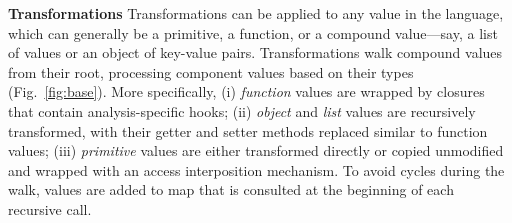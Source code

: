 \documentclass[letterpaper,twocolumn,10pt]{article}
\newcommand{\heading}[1]{\vspace{2pt}\noindent\textbf{#1}\enspace}
\newcommand{\ttt}[1]{\texttt{#1}}
\newcommand{\sys}{{\scshape Lya}\xspace}
\newcommand{\pc}{PIC\xspace}
\begin{document}
\heading{Transformations}
Transformations can be applied to any value in the language, which can generally be a primitive, a function, or a compound value---say, a list of values or an object of key-value pairs.
Transformations walk compound values from their root, processing component values based on their types (Fig.~\ref{fig:base}).
More specifically,
  (i) \emph{function} values are wrapped by closures that contain analysis-specific hooks; %
  (ii) \emph{object} and \emph{list} values are recursively transformed, with their getter and setter methods replaced similar to function values; %
  (iii) \emph{primitive} values are either transformed directly or copied unmodified and wrapped with an access interposition mechanism.
To avoid cycles during the walk, values are added to map that is consulted at the beginning of each recursive call.


% 
% 
% 
\end{document}
